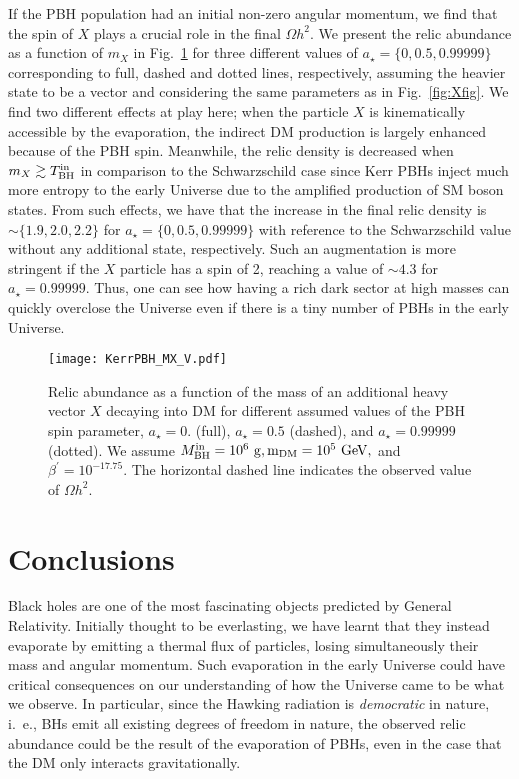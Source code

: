 \documentclass[aps,prd,reprint,twocolumn,preprintnumbers,floatfix,nofootinbib]{revtex4-1}
\newcommand{\MBH}{M_{\rm BH}}
\newcommand{\TBHi}{T_{\rm BH}^{\rm in}}
\newcommand{\as}{a_\star}
\newcommand{\GeV}{\rm GeV}
\newcommand{\g}{\rm g}
\newcommand{\Oh}{\Omega h^2}
\begin{document}
If the PBH population had an initial non-zero angular momentum, we find that the spin of $X$ plays a crucial role in the final $\Oh$. We present the relic abundance as a function of $m_X$ in Fig.~\ref{fig:KXfig} for three different values of $\as=\{0, 0.5, 0.99999\}$ corresponding to full, dashed and dotted lines, respectively, assuming the heavier state to be a vector and considering the same parameters as in Fig.~\ref{fig:Xfig}. We find two different effects at play here; when the particle $X$ is kinematically accessible by the evaporation, the indirect DM production is largely enhanced because of the PBH spin. Meanwhile, the relic density is decreased when $m_{X}\gtrsim \TBHi$ in comparison to the Schwarzschild case since Kerr PBHs inject much more entropy to the early Universe due to the amplified production of SM boson states. From such effects, we have that the increase in the final relic density is $\sim\{1.9, 2.0, 2.2\}$ for $\as=\{0, 0.5, 0.99999\}$ with reference to the Schwarzschild value without any additional state, respectively. Such an augmentation is more stringent if the $X$ particle has a spin of 2, reaching a value of $\sim 4.3$ for $\as=0.99999$. Thus, one can see how having a rich dark sector at high masses can quickly overclose the Universe even if there is a tiny number of PBHs in the early Universe.

\begin{figure}[t!]
 \texttt{[image: KerrPBH\_MX\_V.pdf]}
 \caption{Relic abundance as a function of the mass of an additional heavy vector $X$ decaying into DM for different assumed values of the PBH spin parameter, $\as = 0.$ (full), $\as = 0.5$ (dashed), and $\as = 0.99999$ (dotted). We assume $\MBH^{\rm in} = 10^6~\g, m_{\rm DM} = 10^5~\GeV, $ and $\beta^\prime = 10^{-17.75}$. The horizontal dashed line indicates the observed value of $\Oh$. \label{fig:KXfig}}
\end{figure}

\section{Conclusions}\label{sec:conclus}

Black holes are one of the most fascinating objects predicted by General Relativity. Initially thought to be everlasting, we have learnt that they instead evaporate by emitting a thermal flux of particles, losing simultaneously their mass and angular momentum. Such evaporation in the early Universe could have critical consequences on our understanding of how the Universe came to be what we observe. In particular, since the Hawking radiation is \emph{democratic} in nature, i.~e., BHs emit all existing degrees of freedom in nature, the observed relic abundance could be the result of the evaporation of PBHs, even in the case that the DM only interacts gravitationally.
\end{document}

